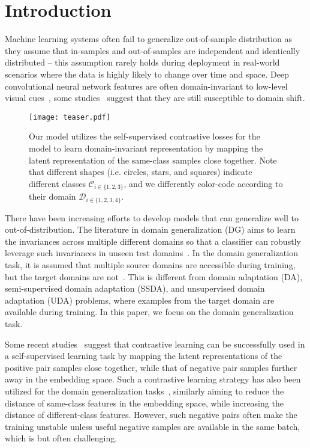 \documentclass[10pt,twocolumn,letterpaper]{article}
\begin{document}
\section{Introduction}
Machine learning systems often fail to generalize out-of-sample distribution as they assume that in-samples and out-of-samples are independent and identically distributed -- this assumption rarely holds during deployment in real-world scenarios where the data is highly likely to change over time and space. Deep convolutional neural network features are often domain-invariant to low-level visual cues~\cite{peng2015learning}, 
some studies~\cite{donahuedeep} suggest that they are still susceptible to domain shift.

\begin{figure}[t]
\begin{center}
   \texttt{[image: teaser.pdf]}
\end{center}
   \caption{Our model utilizes the self-supervised contrastive losses for the model to learn domain-invariant representation by mapping the latent representation of the same-class samples close together. Note that different shapes (i.e. circles, stars, and squares) indicate different classes $\mathcal{C}_{i\in\{1,2,3\}}$, and we differently color-code according to their domain $\mathcal{D}_{i\in\{1,2,3,4\}}$.}
\label{fig:teaser} \end{figure}


There have been increasing efforts to develop models that can generalize well to out-of-distribution. The literature in domain generalization (DG) aims to learn the invariances across multiple different domains so that a classifier can robustly leverage such invariances in unseen test domains~\cite{vapnik1998statistical, ganin2016domain, li2018deep, li2018domain, muandet2013domain, sun2016deep}. In the domain generalization task, it is assumed that multiple source domains are accessible during training, but the target domains are not~\cite{blanchard2011generalizing, muandet2013domain}. This is different from domain adaptation (DA), semi-supervised domain adaptation (SSDA), and unsupervised domain adaptation (UDA) problems, where examples from the target domain are available during training. In this paper, we focus on the domain generalization task.

Some recent studies~\cite{chen2020simple,he2020momentum,oord2018representation} suggest that contrastive learning can be successfully used in a self-supervised learning task by mapping the latent representations of the positive pair samples close together, while that of negative pair samples further away in the embedding space. Such a contrastive learning strategy has also been utilized for the domain generalization tasks~\cite{motiian2017unified, dou2019domain}, similarly aiming to reduce the distance of same-class features in the embedding space, while increasing the distance of different-class features. However, such negative pairs often make the training unstable unless useful negative samples are available in the same batch, which is but often challenging. 
\end{document}
